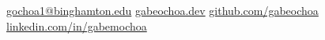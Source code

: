 \documentclass[11pt]{article}
\begin{document}

\begin{center}
\nobreakvspace{0.3em}  %
\end{center}

\href{mailto:gochoa1@binghamton.edu}{gochoa1@binghamton.edu}\sbull
\href{https://gabeochoa.dev/}{gabeochoa.dev}\sbull
\href{https://github.com/gabeochoa}{github.com/gabeochoa}\sbull
\href{https://www.linkedin.com/in/gabemochoa}{linkedin.com/in/gabemochoa}



\spacedhrule{0.2em}{0.2em}  %
\end{document}
